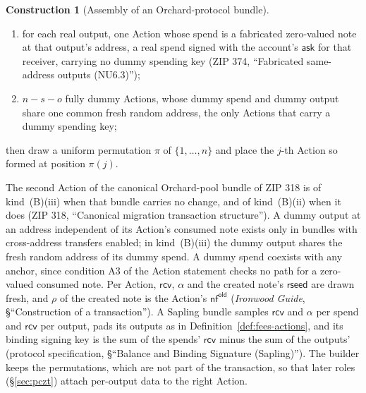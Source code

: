 \documentclass[11pt,a4paper]{article}
\theoremstyle{definition}
\newtheorem{construction}[theorem]{Construction}
\newcommand{\nfsym}{\mathsf{nf}}
\newcommand{\ask}{\ensuremath{\mathsf{ask}}}
\newcommand{\rcv}{\ensuremath{\mathsf{rcv}}}
\begin{document}
\begin{construction}[Assembly of an Orchard-protocol bundle]
\begin{enumerate}[label=(\Alph*)]
\begin{enumerate}[label=(\roman*)]
    spend's nullifier to the address (ZIP 326, ``Fabricated same-address
    outputs and randomized note ciphertexts'');
  \item for each real output, one Action whose spend is a fabricated
    zero-valued note at that output's address, a real spend signed with the
    account's $\ask$ for that receiver, carrying no dummy spending key (ZIP
    374, ``Fabricated same-address outputs (NU6.3)'');
  \item $n - s - o$ fully dummy Actions, whose dummy spend and dummy output
    share one common fresh random address, the only Actions that carry a
    dummy spending key;
  \end{enumerate}
  then draw a uniform permutation $\pi$ of $\{1, \dots, n\}$ and place the
  $j$-th Action so formed at position $\pi(j)$.
\end{enumerate}
The second Action of the canonical Orchard-pool bundle of ZIP 318 is of
kind~(B)(iii) when that bundle carries no change, and of kind~(B)(ii) when
it does (ZIP 318, ``Canonical migration transaction structure''). A dummy
output at an address independent of its Action's consumed note exists only
in bundles with cross-address transfers enabled; in kind~(B)(iii) the dummy
output shares the fresh random address of its dummy spend. A dummy spend
coexists with any anchor, since condition A3 of the Action statement checks no
path for a zero-valued consumed note. Per Action, $\rcv$, $\alpha$ and the
created note's $\mathsf{rseed}$ are drawn fresh, and $\rho$ of the created note
is the Action's $\nfsym^{\mathsf{old}}$ (\emph{Ironwood Guide}, \S``Construction
of a transaction''). A Sapling bundle samples $\rcv$ and $\alpha$ per spend and
$\rcv$ per output, pads its outputs as in Definition~\ref{def:fees-actions}, and
its binding signing key is the sum of the spends' $\rcv$ minus the sum of the
outputs' (protocol specification, \S``Balance and Binding Signature
(Sapling)''). The builder keeps the permutations, which are not part of the
transaction, so that later roles (\S\ref{sec:pczt}) attach per-output data to
the right Action.
\end{construction}
\end{document}
